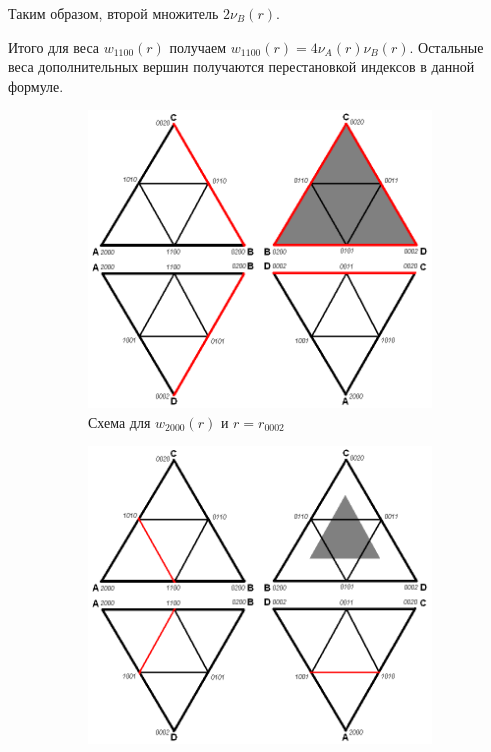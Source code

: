 Таким образом, второй множитель $2\nu_{B}(r)$.

Итого для веса $w_{1100}(r)$ получаем $w_{1100}(r) = 4 \nu_{A}(r) \nu_{B}(r)$. Остальные веса дополнительных вершин получаются перестановкой индексов в данной формуле.



\begin{figure}[h]
\begin{subfigure}[b]{0.5\textwidth}
\centering
\includegraphics[width=\textwidth]{png/tetr-interp-2nd-order-2.png}
\caption{Схема для $w_{2000}(r)$ и $r = r_{0002}$}
\end{subfigure}
\begin{subfigure}[b]{0.5\textwidth}
\centering
\includegraphics[width=\textwidth]{png/tetr-interp-2nd-order-3.png}

\end{subfigure}
\end{figure}
